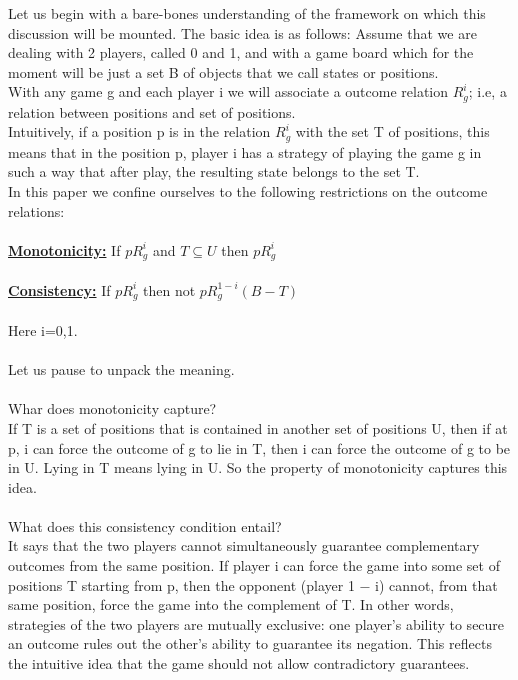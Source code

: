 \documentclass[12pt]{article}
\begin{document}
Let us begin with a bare-bones understanding of the framework on which this 
discussion will be mounted. The basic idea is as follows: Assume that we are dealing with 2 players, called 0 and 1, and with a game board which for the moment will be just a set B of objects that we call states or positions. \\
With any game g and each player i we will associate a outcome relation $R_{g}^{i}$; i.e, a relation between positions and set of positions. \\
Intuitively, if a position p is in the relation $R_{g}^{i}$ with the set T of positions, this means that in the position p, player i has a strategy of playing the game g in such a way that after play, the resulting state belongs to the set T. \\ 
In this paper we confine ourselves to the following restrictions on the outcome relations: \\ \\
\underline{\textbf{Monotonicity:}} If $pR_{g}^{i}$ and $T\subseteq U$ then $pR_{g}^{i}$ \\ \\
\underline{\textbf{Consistency:}} If $pR_{g}^{i}$ then not $pR_{g}^{1-i}(B-T)$ \\ \\
Here i=0,1. \\ \\
Let us pause to unpack the meaning. \\ \\
Whar does monotonicity capture? \\
If T is a set of positions that is contained in another set of positions U, then if at p, i can force the outcome of g to lie in T, then i can force the outcome of g to be in U. Lying in T means lying in U. So the property of monotonicity captures this idea. \\ \\
What does this consistency condition entail? \\ 
It says that the two players cannot simultaneously guarantee complementary outcomes from the same position. If player i can force the game into some set of positions T starting from p, then the opponent (player 1 − i) cannot, from that same position, force the game into the complement of T. In other words, strategies of the two players are mutually exclusive: one player’s ability to secure an outcome rules out the other’s ability to guarantee its negation. This reflects the intuitive idea that the game should not allow contradictory guarantees. \\ \\
\end{document}
